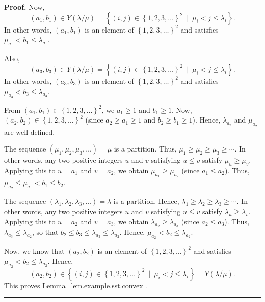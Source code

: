 \documentclass[numbers=enddot,12pt,final,onecolumn,notitlepage,abstracton]{scrartcl}
\theoremstyle{definition}
\newenvironment{proof}[1][Proof]{\noindent\textbf{#1.} }{\ \rule{0.5em}{0.5em}}
\newenvironment{verlong}{}{}
\begin{document}
\begin{verlong}
\begin{footnotesize}
\begin{proof}
Now,
\[
\left(  a_{1},b_{1}\right)  \in Y\left(  \lambda/\mu\right)  =\left\{  \left(
i,j\right)  \in\left\{  1,2,3,\ldots\right\}  ^{2}\ \mid\ \mu_{i}<j\leq
\lambda_{i}\right\}  .
\]
In other words, $\left(  a_{1},b_{1}\right)  $ is an element of $\left\{
1,2,3,\ldots\right\}  ^{2}$ and satisfies $\mu_{a_{1}}<b_{1}\leq\lambda
_{a_{1}}$.

Also,
\[
\left(  a_{3},b_{3}\right)  \in Y\left(  \lambda/\mu\right)  =\left\{  \left(
i,j\right)  \in\left\{  1,2,3,\ldots\right\}  ^{2}\ \mid\ \mu_{i}<j\leq
\lambda_{i}\right\}  .
\]
In other words, $\left(  a_{3},b_{3}\right)  $ is an element of $\left\{
1,2,3,\ldots\right\}  ^{2}$ and satisfies $\mu_{a_{3}}<b_{3}\leq\lambda
_{a_{3}}$.

From $\left(  a_{1},b_{1}\right)  \in\left\{  1,2,3,\ldots\right\}  ^{2}$, we
$a_{1} \geq1$ and $b_{1} \geq1$. Now, $\left(  a_{2},b_{2}\right)  \in\left\{
1,2,3,\ldots\right\}  ^{2}$ (since $a_{2} \geq a_{1} \geq1$ and $b_{2} \geq
b_{1} \geq1$). Hence, $\lambda_{a_{2}}$ and $\mu_{a_{2}}$ are well-defined.

The sequence $\left(  \mu_{1},\mu_{2},\mu_{3},\ldots\right)  =\mu$ is a
partition. Thus, $\mu_{1}\geq\mu_{2}\geq\mu_{3}\geq\cdots$. In other words,
any two positive integers $u$ and $v$ satisfying $u\leq v$ satisfy $\mu
_{u}\geq\mu_{v}$. Applying this to $u=a_{1}$ and $v=a_{2}$, we obtain
$\mu_{a_{1}}\geq\mu_{a_{2}}$ (since $a_{1}\leq a_{2}$). Thus, $\mu_{a_{2}}%
\leq\mu_{a_{1}}<b_{1}\leq b_{2}$.

The sequence $\left(  \lambda_{1},\lambda_{2},\lambda_{3},\ldots\right)
=\lambda$ is a partition. Hence, $\lambda_{1}\geq\lambda_{2}\geq\lambda
_{3}\geq\cdots$. In other words, any two positive integers $u$ and $v$
satisfying $u\leq v$ satisfy $\lambda_{u}\geq\lambda_{v}$. Applying this to
$u=a_{2}$ and $v=a_{3}$, we obtain $\lambda_{a_{2}}\geq\lambda_{a_{3}}$ (since
$a_{2}\leq a_{3}$). Thus, $\lambda_{a_{3}}\leq\lambda_{a_{2}}$, so that
$b_{2}\leq b_{3}\leq\lambda_{a_{3}}\leq\lambda_{a_{2}}$. Hence, $\mu_{a_{2}%
}<b_{2}\leq\lambda_{a_{2}}$.

Now, we know that $\left(  a_{2},b_{2}\right)  $ is an element of $\left\{
1,2,3,\ldots\right\}  ^{2}$ and satisfies $\mu_{a_{2}}<b_{2}\leq\lambda
_{a_{2}}$. Hence,
\[
\left(  a_{2},b_{2}\right)  \in\left\{  \left(  i,j\right)  \in\left\{
1,2,3,\ldots\right\}  ^{2}\ \mid\ \mu_{i}<j\leq\lambda_{i}\right\}  =Y\left(
\lambda/\mu\right)  .
\]
This proves Lemma~\ref{lem.example.sst.convex}.
\end{proof}


\end{footnotesize}
\end{verlong}
\end{document}
